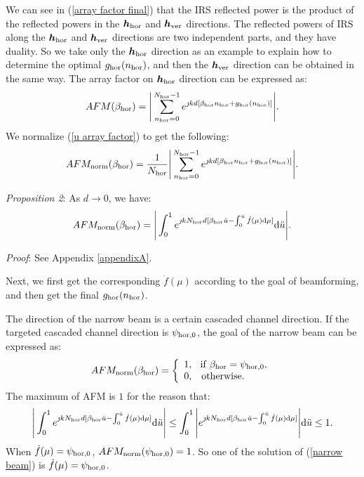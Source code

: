 \documentclass[12pt,draftclsnofoot,onecolumn]{IEEEtran}
\begin{document}
	We can see in  (\ref{array factor final}) that the IRS reflected power is the product of the reflected powers in the ${\bm h}_{\rm hor}$  and  ${\bm h}_{\rm ver}$ directions. The reflected powers of  IRS along the ${\bm h}_{\rm hor}$ and ${\bm h}_{\rm ver}$ directions are two independent parts, and they have duality. So we  take only the ${\bm h}_{\rm hor}$ direction as an example to explain how to determine the optimal $g_{\rm hor}(n_{\rm hor})$, and then the ${\bm h}_{\rm ver}$ direction can be obtained in the same way. The array factor on ${\bm h}_{\rm hor}$ direction can be expressed as:
	\begin{equation}\label{u array factor}
		AFM({\beta _{\rm hor}}) = \Bigg|\sum\limits_{{n_{\rm hor}} = 0}^{N_{\rm hor} - 1} {{e^{{\jmath}kd[{\beta _{\rm hor}}{n_{\rm hor}} + {g_{\rm hor}}({n_{\rm hor}})]}}} \Bigg|.
	\end{equation}
	We normalize (\ref{u array factor}) to get the following:
	\begin{equation}\label{normed u array factor}
		AFM_{\rm norm}({\beta _{\rm hor}}) = \frac{1}{N_{\rm hor}}\Bigg|\sum\limits_{{n_{\rm hor}} = 0}^{N_{\rm hor} - 1} {{e^{{\jmath}kd[{\beta _{\rm hor}}{n_{\rm hor}} + {g_{\rm hor}}({n_{\rm hor}})]}}} \Bigg|.
	\end{equation}
	
	{\itshape Proposition 2}: As $d \to 0$, we have:
	\begin{equation}\label{g_represent}
		AFM_{\rm norm}({\beta _{\rm hor}}) = \Bigg|\int_0^1 {{e^{{\jmath}kN_{\rm hor}d[{\beta _{\rm hor}}\ddot{u}  - \int_0^{\ddot{u}} {\dot{f}(\mu){\rm d}{\mu}} ]}}} {\rm d}{\ddot{u}} \Bigg|.
	\end{equation}
	
	{\itshape Proof}: See Appendix \ref{appendixA}.
	
	Next, we first get the corresponding ${\dot{f}(\mu)}$ according to the goal of beamforming, and then  get the final $g_{\rm hor}(n_{\rm hor})$.
	
	
	The direction of the narrow beam is a certain cascaded channel direction. If  the targeted  cascaded channel direction is $\psi_{{\rm hor},0}$, the goal of the  narrow beam can be expressed as:
	\begin{equation}\label{narrow beam}
		AFM_{\rm norm}({\beta _{\rm hor}}) = \left\{ \begin{array}{l}
			1,\,\;\;{\rm if}\;{\beta _{\rm hor}} = {\psi _{{\rm hor},0}},\\
			0,\;\;\;{\rm otherwise}.
		\end{array} \right.
	\end{equation}
	The maximum of AFM is $1$ for the reason that:
	\begin{equation}\label{lessequal}
		\Bigg|\int_0^1 {{e^{{\jmath}kN_{\rm hor}d[{\beta _{\rm hor}}\ddot{u}  - \int_0^{\ddot{u}} {\dot{f}(\mu){\rm d}{\mu}} ]}}} {\rm d}{\ddot{u}} \Bigg| \leq \int_0^1 \Bigg|{{e^{{\jmath}kN_{\rm hor}d[{\beta _{\rm hor}}\ddot{u}  - \int_0^{\ddot{u}} {\dot{f}(\mu){\rm d}{\mu}} ]}}} \Bigg|{\rm d}{\ddot{u}}  \leq 1 .
	\end{equation}
	When $\dot{f}(\mu)=\psi_{{\rm hor},0}$, $AFM_{\rm norm}({\psi_{{\rm hor},0}})=1$. So one of the solution of (\ref{narrow beam}) is $\dot{f}(\mu)=\psi_{{\rm hor},0}$.
	
\end{document}
